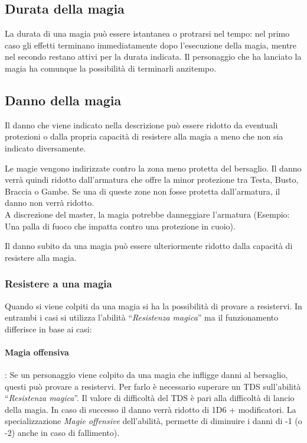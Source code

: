 \documentclass[../manuale_main.tex]{subfiles}
\begin{document}
\subsection{Durata della magia}
La durata di una magia può essere istantanea o protrarsi nel tempo: nel primo caso gli effetti terminano immediatamente dopo l'esecuzione della magia, mentre nel secondo restano attivi per la durata indicata. Il personaggio che ha lanciato la magia ha comunque la possibilità di terminarli anzitempo.


\subsection{Danno della magia}
Il danno che viene indicato nella descrizione può essere ridotto da eventuali protezioni o dalla propria capacità di resistere alla magia a meno che non sia indicato diversamente.

Le magie vengono indirizzate contro la zona meno protetta del bersaglio. Il danno verrà quindi ridotto dall'armatura che offre la minor protezione tra Testa, Busto, Braccia o Gambe. Se una di queste zone non fosse protetta dall'armatura, il danno non verrà ridotto.\\
A discrezione del master, la magia potrebbe danneggiare l'armatura (Esempio: Una palla di fuoco che impatta contro una protezione in cuoio).

Il danno subito da una magia può essere ulteriormente ridotto dalla capacità di resistere alla magia.


\subsubsection{Resistere a una magia}
Quando si viene colpiti da una magia si ha la possibilità di provare a resistervi. In entrambi i casi si utilizza l'abilità ``\emph{Resistenza magica}'' ma il funzionamento differisce in base ai casi:
\paragraph{\textbf{Magia offensiva}}: Se un personaggio viene colpito da una magia che infligge danni al bersaglio, questi può provare a resistervi. Per farlo è necessario superare un TDS sull'abilità ``\emph{Resistenza magica}''. Il valore di difficoltà del TDS è pari alla difficoltà di lancio della magia. In caso di successo il danno verrà ridotto di 1D6 + modificatori. La specializzazione \emph{Magie offensive} dell'abilità, permette di diminuire i danni di -1 (o -2) anche in caso di fallimento).
\end{document}
